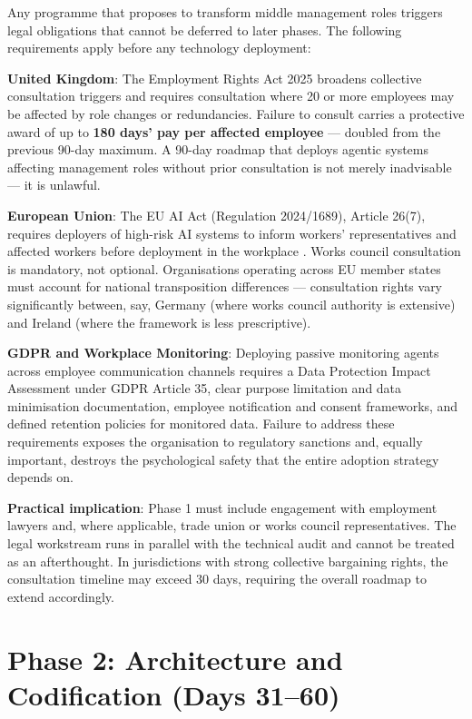 \begin{cautionbox}[title={Employment Law and Consultation Obligations}]
Any programme that proposes to transform middle management roles triggers legal obligations that cannot be deferred to later phases. The following requirements apply before any technology deployment:

\textbf{United Kingdom}: The Employment Rights Act 2025 \parencite{ERA2025} broadens collective consultation triggers and requires consultation where 20 or more employees may be affected by role changes or redundancies. Failure to consult carries a protective award of up to \textbf{180 days' pay per affected employee} --- doubled from the previous 90-day maximum. A 90-day roadmap that deploys agentic systems affecting management roles without prior consultation is not merely inadvisable --- it is unlawful.

\textbf{European Union}: The EU AI Act (Regulation 2024/1689), Article 26(7), requires deployers of high-risk AI systems to inform workers' representatives and affected workers before deployment in the workplace \parencite{EUAIAct2025}. Works council consultation is mandatory, not optional. Organisations operating across EU member states must account for national transposition differences --- consultation rights vary significantly between, say, Germany (where works council authority is extensive) and Ireland (where the framework is less prescriptive).

\textbf{GDPR and Workplace Monitoring}: Deploying passive monitoring agents across employee communication channels requires a Data Protection Impact Assessment under GDPR Article 35, clear purpose limitation and data minimisation documentation, employee notification and consent frameworks, and defined retention policies for monitored data. Failure to address these requirements exposes the organisation to regulatory sanctions and, equally important, destroys the psychological safety that the entire adoption strategy depends on.

\textbf{Practical implication}: Phase 1 must include engagement with employment lawyers and, where applicable, trade union or works council representatives. The legal workstream runs in parallel with the technical audit and cannot be treated as an afterthought. In jurisdictions with strong collective bargaining rights, the consultation timeline may exceed 30 days, requiring the overall roadmap to extend accordingly.
\end{cautionbox}

\section{Phase 2: Architecture and Codification (Days 31--60)}


